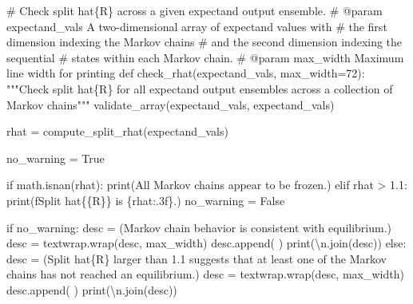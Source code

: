 \documentclass[
  letterpaper,
  DIV=11,
  numbers=noendperiod]{scrartcl}
\newenvironment{Shaded}{\begin{snugshade}}{\end{snugshade}}
\newcommand{\BuiltInTok}[1]{\textcolor[rgb]{0.00,0.23,0.31}{#1}}
\newcommand{\CharTok}[1]{\textcolor[rgb]{0.13,0.47,0.30}{#1}}
\newcommand{\CommentTok}[1]{\textcolor[rgb]{0.37,0.37,0.37}{#1}}
\newcommand{\ControlFlowTok}[1]{\textcolor[rgb]{0.00,0.23,0.31}{#1}}
\newcommand{\DecValTok}[1]{\textcolor[rgb]{0.68,0.00,0.00}{#1}}
\newcommand{\FloatTok}[1]{\textcolor[rgb]{0.68,0.00,0.00}{#1}}
\newcommand{\KeywordTok}[1]{\textcolor[rgb]{0.00,0.23,0.31}{#1}}
\newcommand{\NormalTok}[1]{\textcolor[rgb]{0.00,0.23,0.31}{#1}}
\newcommand{\OperatorTok}[1]{\textcolor[rgb]{0.37,0.37,0.37}{#1}}
\newcommand{\SpecialCharTok}[1]{\textcolor[rgb]{0.37,0.37,0.37}{#1}}
\newcommand{\SpecialStringTok}[1]{\textcolor[rgb]{0.13,0.47,0.30}{#1}}
\newcommand{\StringTok}[1]{\textcolor[rgb]{0.13,0.47,0.30}{#1}}
\newcommand{\VariableTok}[1]{\textcolor[rgb]{0.07,0.07,0.07}{#1}}
\begin{document}
\begin{Shaded}
\begin{Highlighting}[]
\CommentTok{\# Check split hat\{R\} across a given expectand output ensemble.}
\CommentTok{\# @param expectand\_vals A two{-}dimensional array of expectand values with}
\CommentTok{\#                       the first dimension indexing the Markov chains}
\CommentTok{\#                       and the second dimension indexing the sequential}
\CommentTok{\#                       states within each Markov chain.}
\CommentTok{\# @param max\_width Maximum line width for printing}
\KeywordTok{def}\NormalTok{ check\_rhat(expectand\_vals, max\_width}\OperatorTok{=}\DecValTok{72}\NormalTok{):}
  \CommentTok{"""Check split hat\{R\} for all expectand output ensembles across}
\CommentTok{     a collection of Markov chains"""}
\NormalTok{  validate\_array(expectand\_vals, }\StringTok{\textquotesingle{}expectand\_vals\textquotesingle{}}\NormalTok{)}

\NormalTok{  rhat }\OperatorTok{=}\NormalTok{ compute\_split\_rhat(expectand\_vals)}

\NormalTok{  no\_warning }\OperatorTok{=} \VariableTok{True}

  \ControlFlowTok{if}\NormalTok{ math.isnan(rhat):}
    \BuiltInTok{print}\NormalTok{(}\StringTok{\textquotesingle{}All Markov chains appear to be frozen.\textquotesingle{}}\NormalTok{)}
  \ControlFlowTok{elif}\NormalTok{ rhat }\OperatorTok{\textgreater{}} \FloatTok{1.1}\NormalTok{:}
    \BuiltInTok{print}\NormalTok{(}\SpecialStringTok{f\textquotesingle{}Split hat}\CharTok{\{\{}\SpecialStringTok{R}\CharTok{\}\}}\SpecialStringTok{ is }\SpecialCharTok{\{}\NormalTok{rhat}\SpecialCharTok{:.3f\}}\SpecialStringTok{.\textquotesingle{}}\NormalTok{)}
\NormalTok{    no\_warning }\OperatorTok{=} \VariableTok{False}

  \ControlFlowTok{if}\NormalTok{ no\_warning:}
\NormalTok{    desc }\OperatorTok{=}\NormalTok{ (}\StringTok{\textquotesingle{}Markov chain behavior is consistent with equilibrium.\textquotesingle{}}\NormalTok{)}
\NormalTok{    desc }\OperatorTok{=}\NormalTok{ textwrap.wrap(desc, max\_width)}
\NormalTok{    desc.append(}\StringTok{\textquotesingle{} \textquotesingle{}}\NormalTok{)}
    \BuiltInTok{print}\NormalTok{(}\StringTok{\textquotesingle{}}\CharTok{\textbackslash{}n}\StringTok{\textquotesingle{}}\NormalTok{.join(desc))}
  \ControlFlowTok{else}\NormalTok{:}
\NormalTok{    desc }\OperatorTok{=}\NormalTok{ (}\StringTok{\textquotesingle{}Split hat}\SpecialCharTok{\{R\}}\StringTok{ larger than 1.1 suggests that at least one \textquotesingle{}}
            \StringTok{\textquotesingle{}of the Markov chains has not reached an equilibrium.\textquotesingle{}}\NormalTok{)}
\NormalTok{    desc }\OperatorTok{=}\NormalTok{ textwrap.wrap(desc, max\_width)}
\NormalTok{    desc.append(}\StringTok{\textquotesingle{} \textquotesingle{}}\NormalTok{)}
    \BuiltInTok{print}\NormalTok{(}\StringTok{\textquotesingle{}}\CharTok{\textbackslash{}n}\StringTok{\textquotesingle{}}\NormalTok{.join(desc))}
\end{Highlighting}
\end{Shaded}
\end{document}

